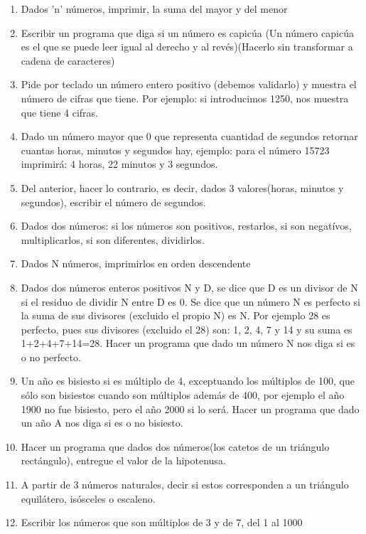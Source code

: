 \documentclass[11pt,letterpaper]{article}
\begin{document}
\begin{enumerate}
        \item Dados 'n' números, imprimir, la suma del mayor y del menor
        
        \item Escribir un programa que diga si un número es capicúa (Un número capicúa es el que se puede leer igual al derecho y al revés)(Hacerlo sin transformar a cadena de caracteres)
        
        \item Pide por teclado un número entero positivo (debemos validarlo) y muestra  el número de cifras que tiene. Por ejemplo: si introducimos 1250, nos muestra que tiene 4 cifras.
        
        \item Dado un número mayor que 0 que representa cuantidad de segundos retornar cuantas horas, minutos y segundos hay, ejemplo: para el número 15723 imprimirá: 4 horas, 22 minutos y 3 segundos.
        
        \item Del anterior, hacer lo contrario, es decir, dados 3 valores(horas, minutos y segundos), escribir el número de segundos.
        
        \item Dados dos números: si los números son positivos, restarlos, si son negatívos, multiplicarlos, si son diferentes, dividirlos.
        
        \item Dados N números, imprimirlos en orden descendente
        
        \item Dados dos números enteros positivos N y D, se dice que D es un divisor de N si el residuo de dividir N entre D es 0. Se dice que un número N es perfecto si la suma de sus divisores (excluido el propio N) es N. Por ejemplo 28 es perfecto, pues sus divisores (excluido el 28) son: 1, 2, 4, 7 y 14 y su suma es 1+2+4+7+14=28. Hacer un programa que dado un número N nos diga si es o no perfecto.
        
        \item Un año es bisiesto si es múltiplo de 4, exceptuando los múltiplos de 100, que sólo son bisiestos cuando son múltiplos además de 400, por ejemplo el año 1900 no fue bisiesto, pero el año 2000 si lo será. Hacer un programa que dado un año A nos diga si es o no bisiesto.
        
        \item Hacer un programa que dados dos números(los catetos de un triángulo rectángulo), entregue el valor de la hipotenusa.
        
        \item A partir de 3 números naturales, decir si estos corresponden a un triángulo equilátero, isósceles o escaleno.
        
        \item Escribir los números que son múltiplos de 3 y de 7, del 1 al 1000

    \end{enumerate}
%
%
\end{document}
